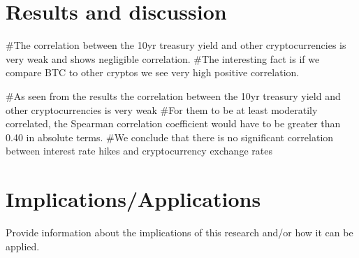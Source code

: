 \documentclass[11pt]{article}
\begin{document}
\section{Results and discussion}


#The correlation between the 10yr treasury yield and other cryptocurrencies is very weak and shows negligible correlation.
#The interesting fact is if we compare BTC to other cryptos we see very high positive correlation.


#As seen from the results the correlation between the 10yr treasury yield and other cryptocurrencies is very weak
#For them to be at least moderatily correlated, the Spearman correlation coefficient would have to be greater than 0.40 in absolute terms.
#We conclude that there is no significant correlation between interest rate hikes and cryptocurrency exchange rates

\section{Implications/Applications}
Provide information about the implications of this research and/or how it can be applied.

\newpage




\end{document}
